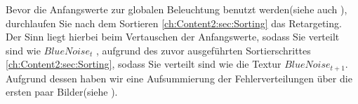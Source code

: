 Bevor die Anfangswerte zur globalen Beleuchtung benutzt werden(siehe auch ), durchlaufen Sie nach dem Sortieren 
\ref{ch:Content2:sec:Sorting} das Retargeting. Der Sinn liegt hierbei beim Vertauschen der Anfangswerte, sodass Sie 
verteilt sind wie $BlueNoise_{t}$ , aufgrund des zuvor ausgeführten Sortierschrittes \ref{ch:Content2:sec:Sorting},
sodass Sie verteilt sind wie die Textur $BlueNoise_{t+1}$. Aufgrund dessen haben wir eine Aufsummierung der
 Fehlerverteilungen über die ersten paar Bilder(siehe ).

\begin{figure}[H]



\end{figure}
